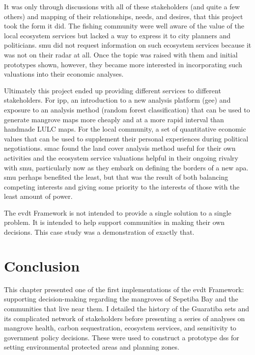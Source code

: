 It was only through discussions with all of these stakeholders (and quite a few others) and mapping of their relationships, needs, and desires, that this project took the form it did. The fishing community were well aware of the value of the local ecosystem services but lacked a way to express it to city planners and politicians. \ac{smu} did not request information on such ecosystem services because it was not on their radar at all. Once the topic was raised with them and initial prototypes shown, however, they became more interested in incorporating such valuations into their economic analyses. 

Ultimately this project ended up providing different services to different stakeholders. For \ac{ipp}, an introduction to a new analysis platform (\ac{gee}) and exposure to an analysis method (random forest classification) that can be used to generate mangrove maps more cheaply and at a more rapid interval than handmade LULC maps. For the local community, a set of quantitative economic values that can be used to supplement their personal experiences during political negotiations. \ac{smac} found the land cover analysis method useful for their own activities and the ecosystem service valuations helpful in their ongoing rivalry with \ac{smu}, particularly now as they embark on defining the borders of a new \ac{apa}. \ac{smu} perhaps benefited the least, but that was the result of both balancing competing interests and giving some priority to the interests of those with the least amount of power.

The \ac{evdt} Framework is not intended to provide a single solution to a single problem. It is intended to help support communities in making their own decisions. This case study was a demonstration of exactly that.


\section{Conclusion}

This chapter presented one of the first implementations of the \ac{evdt} Framework: supporting decision-making regarding the mangroves of Sepetiba Bay and the communities that live near them. I detailed the history of the Guaratiba \ac{sets} and its complicated network of stakeholders before presenting a series of analyses on mangrove health, carbon sequestration, ecosystem services, and sensitivity to government policy decisions. These were used to construct a prototype \ac{dss} for setting environmental protected areas and planning zones. 

